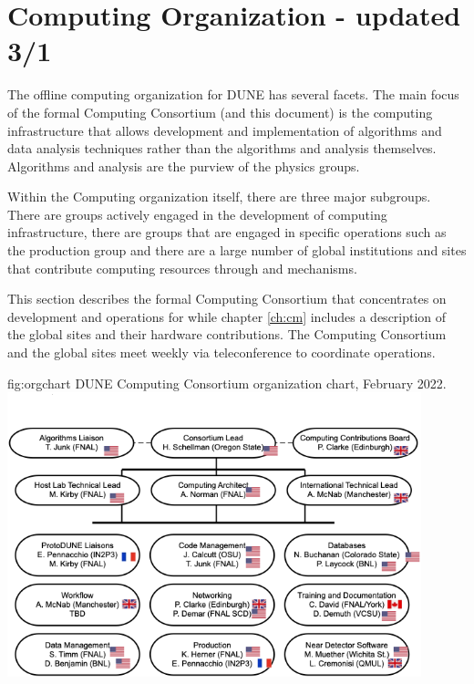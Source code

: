 \documentclass[../main-v1.tex]{subfiles}
\begin{document}
\chapter{Computing Organization - updated 3/1}\label{ch:org}

The offline computing organization for DUNE has several facets. The main focus of the formal Computing Consortium (and this document) is the computing infrastructure that allows development and implementation of algorithms and data analysis techniques rather than the algorithms and analysis themselves. Algorithms and analysis are the purview of the physics groups.

Within the Computing organization itself, there are three major subgroups.  There are groups actively engaged in the development of  computing infrastructure, there are groups that are engaged in  specific operations such as the production group and there are a large number of global institutions and sites that contribute computing resources through  and  mechanisms.  

This section describes the formal Computing Consortium that concentrates on development and operations for  while chapter \ref{ch:cm} includes a description of the global sites and their hardware contributions. The Computing Consortium and the global sites meet weekly via teleconference to coordinate operations. 

\begin{dunefigure}
{fig:orgchart}
{DUNE Computing Consortium organization chart, February 2022.}
{\includegraphics[width=0.9\textwidth]{graphics/IntroFigures/MTOrgChartFeb22.png}}
\end{dunefigure}
\end{document}
